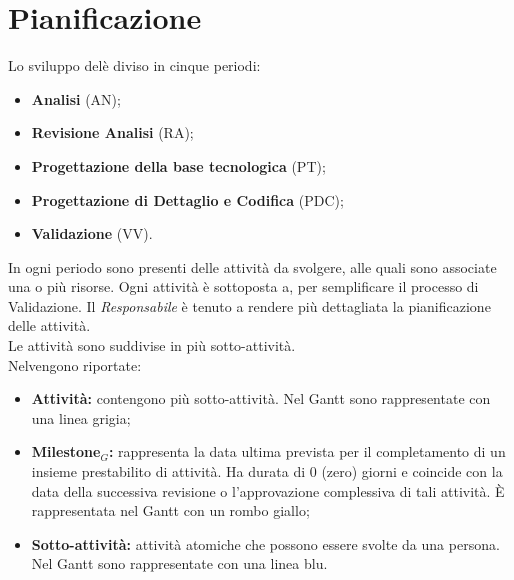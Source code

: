 \chapter{Pianificazione}
Lo sviluppo delè diviso in cinque periodi:
\begin{itemize}
    \item \textbf{Analisi} (AN);
    \item \textbf{Revisione Analisi} (RA);
    \item \textbf{Progettazione della base tecnologica} (PT);
    \item \textbf{Progettazione di Dettaglio e Codifica} (PDC);
    \item \textbf{Validazione} (VV).
\end{itemize}
In ogni periodo sono presenti delle attività da svolgere, alle quali sono associate una o più risorse. Ogni attività è sottoposta a, per semplificare il processo di Validazione. Il \textit{Responsabile} è tenuto a rendere più dettagliata la pianificazione delle attività.\\
Le attività sono suddivise in più sotto-attività.\\
Nelvengono riportate:
\begin{itemize}
    \item \textbf{Attività:} contengono più sotto-attività. Nel Gantt sono rappresentate con una linea grigia;
    \item \textbf{Milestone$_{G}$:} rappresenta la data ultima prevista per il completamento di un insieme prestabilito di attività. Ha durata di 0 (zero) giorni e coincide con la data della successiva revisione o l'approvazione complessiva di tali attività. È rappresentata nel Gantt con un rombo giallo;
    \item \textbf{Sotto-attività:} attività atomiche che possono essere svolte da una persona. Nel Gantt sono rappresentate con una linea blu.  
\end{itemize}
